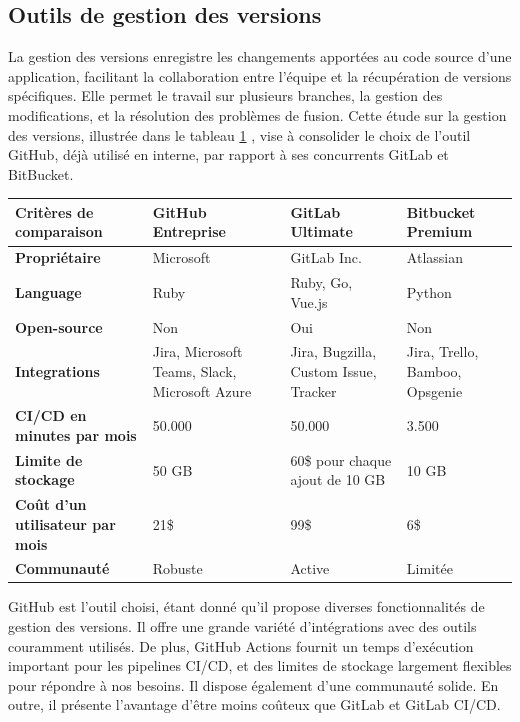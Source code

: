 \subsection{Outils de gestion des versions}
La gestion des versions \cite{axopen} enregistre les changements apportées au code source d'une application, facilitant la collaboration entre l'équipe et la récupération de versions spécifiques. Elle permet le travail sur plusieurs branches, la gestion des modifications, et la résolution des problèmes de fusion.
Cette étude sur la gestion des versions, illustrée dans le tableau \ref{tableau:comparatif3} \cite{strauss2018}, vise à consolider le choix de l'outil GitHub, déjà utilisé en interne, par rapport à ses concurrents GitLab et BitBucket.
\begin{table}[H]
\centering
\caption{Tableau comparatif des outils de gestion des versions GitHub, Gitlab et Bitbucket.}
\begin{longtable}{|p{3.5cm}|p{3.75cm}|p{3.75cm}|p{3.75cm}|}
\hline
\textbf{Critères de comparaison} & \textbf{GitHub Entreprise} & \textbf{GitLab Ultimate} & \textbf{Bitbucket Premium}\\
\hline
\textbf{Propriétaire} & Microsoft & GitLab Inc. & Atlassian \\
\hline
\textbf{Language} & Ruby & Ruby, Go, Vue.js & Python\\
\hline
\textbf{Open-source} & Non & Oui & Non \\
\hline
\textbf{Integrations} & Jira, Microsoft Teams, Slack, Microsoft Azure & Jira, Bugzilla, Custom Issue, Tracker & Jira, Trello, Bamboo, Opsgenie \\ 
\hline
\textbf{CI/CD en minutes par mois} &  50.000 &  50.000 & 3.500 \\
\hline
\textbf{Limite de stockage} & 50 GB  &  60\$ pour chaque ajout de 10 GB & 10 GB \\
\hline
\textbf{Coût d'un utilisateur par mois} & 21\$ & 99\$ & 6\$\\
\hline
\textbf{Communauté} & Robuste & Active & Limitée\\
\hline
\end{longtable}
\label{tableau:comparatif3}
\end{table}
GitHub est l'outil choisi, étant donné qu'il propose diverses fonctionnalités de gestion des versions. Il offre une grande variété d'intégrations avec des outils couramment utilisés. De plus, GitHub Actions fournit un temps d'exécution important pour les pipelines CI/CD, et des limites de stockage largement flexibles pour répondre à nos besoins. Il dispose également d'une communauté solide. En outre, il présente l'avantage d'être moins coûteux que GitLab et GitLab CI/CD.

